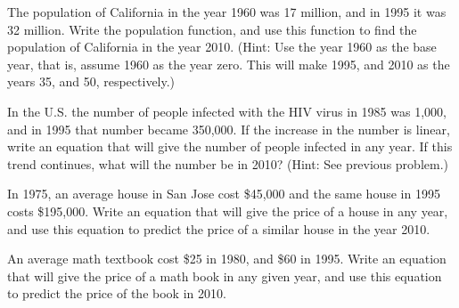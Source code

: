 \begin{puzzle}
    \item The population of California in the year 1960 was 17 million, and in 1995 it was 32 million. Write the population function, and use this function to find the population of California in the year 2010. (Hint: Use the year 1960 as the base year, that is, assume 1960 as the year zero. This will make 1995, and 2010 as the years 35, and 50, respectively.)
\end{puzzle}

\begin{puzzle}
    \item In the U.S. the number of people infected with the HIV virus in 1985 was 1,000, and in 1995 that number became 350,000. If the increase in the number is linear, write an equation that will give the number of people infected in any year. If this trend continues, what will the number be in 2010? (Hint: See previous problem.)
\end{puzzle}


\begin{puzzle}
    \item In 1975, an average house in San Jose cost \$45,000 and the same house in 1995 costs \$195,000. Write an equation that will give the price of a house in any year, and use this equation to predict the price of a similar house in the year 2010.
\end{puzzle}

\begin{puzzle}
    \item An average math textbook cost \$25 in 1980, and \$60 in 1995. Write an equation that will give the price of a math book in any given year, and use this equation to predict the price of the book in 2010.
\end{puzzle}
